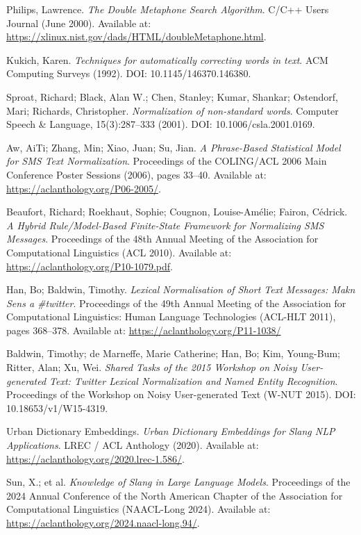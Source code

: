 \documentclass[12pt]{article}
\begin{document}
\begin{thebibliography}{9}
Philips, Lawrence.
\textit{The Double Metaphone Search Algorithm}.
C/C++ Users Journal (June 2000).
Available at: \url{https://xlinux.nist.gov/dads/HTML/doubleMetaphone.html}.

Kukich, Karen.
\textit{Techniques for automatically correcting words in text}.
ACM Computing Surveys (1992).
DOI: 10.1145/146370.146380.

Sproat, Richard; Black, Alan W.; Chen, Stanley; Kumar, Shankar; Ostendorf, Mari; Richards, Christopher.
\textit{Normalization of non-standard words}.
Computer Speech \& Language, 15(3):287–333 (2001).
DOI: 10.1006/csla.2001.0169.

Aw, AiTi; Zhang, Min; Xiao, Juan; Su, Jian.
\textit{A Phrase-Based Statistical Model for SMS Text Normalization}.
Proceedings of the COLING/ACL 2006 Main Conference Poster Sessions (2006), pages 33–40.
Available at: \url{https://aclanthology.org/P06-2005/}.

Beaufort, Richard; Roekhaut, Sophie; Cougnon, Louise-Amélie; Fairon, Cédrick.
\textit{A Hybrid Rule/Model-Based Finite-State Framework for Normalizing SMS Messages}.
Proceedings of the 48th Annual Meeting of the Association for Computational Linguistics (ACL 2010).
Available at: \url{https://aclanthology.org/P10-1079.pdf}.

Han, Bo; Baldwin, Timothy.
\textit{Lexical Normalisation of Short Text Messages: Makn Sens a \#twitter}.
Proceedings of the 49th Annual Meeting of the Association for Computational Linguistics: Human Language Technologies (ACL-HLT 2011), pages 368–378.
Available at: \url{https://aclanthology.org/P11-1038/}

Baldwin, Timothy; de Marneffe, Marie Catherine; Han, Bo; Kim, Young-Bum; Ritter, Alan; Xu, Wei.
\textit{Shared Tasks of the 2015 Workshop on Noisy User-generated Text: Twitter Lexical Normalization and Named Entity Recognition}.
Proceedings of the Workshop on Noisy User-generated Text (W-NUT 2015).
DOI: 10.18653/v1/W15-4319.

Urban Dictionary Embeddings.
\textit{Urban Dictionary Embeddings for Slang NLP Applications}.
LREC / ACL Anthology (2020).
Available at: \url{https://aclanthology.org/2020.lrec-1.586/}.

Sun, X.; et al.
\textit{Knowledge of Slang in Large Language Models}.
Proceedings of the 2024 Annual Conference of the North American Chapter of the Association for Computational Linguistics (NAACL-Long 2024).
Available at: \url{https://aclanthology.org/2024.naacl-long.94/}.


\end{thebibliography}
\end{document}
